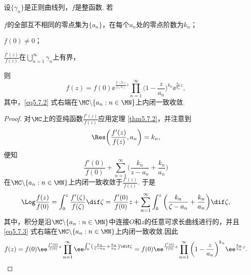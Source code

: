 \begin{theorem}\label{thm5.7.3}
设$\{\gamma_n\}$是正则曲线列，$f$是整函数. 若
\begin{eenum}
  \item $f$的全部互不相同的零点集为$\{a_n\}$，在每个$a_n$处的零点阶数为$k_n$；
  \item $f(0)\ne0$；
  \item $\frac{f'(z)}{f(z)}$在$\bigcup_{n=1}^\infty\gamma_n$上有界，
\end{eenum}
则
\begin{equation}\label{eq5.7.2}
f(z)=f(0)\ee^{\frac{f'(0)}{f(0)}z}\prod_{n=1}^\infty\bigg(1-\frac z{a_n}\bigg)
^{k_n}\ee^{\frac{k_n}{a_n}z},
\end{equation}
其中，\eqref{eq5.7.2} 式右端在$\MC\backslash\{a_n:n\in\MN\}$上内闭一致收敛.
\end{theorem}
\begin{proof}
对$\MC$上的亚纯函数$\frac{f'(z)}{f(z)}$应用定理 \ref{thm5.7.2}，并注意到
\[\Res\bigg(\frac{f'(z)}{f(z)},a_n\bigg)=k_n,\]
便知
\[\frac{f'(0)}{f(0)}+\sum_{n=1}^\infty\bigg(\frac{k_n}{z-a_n}+\frac{k_n}{a_n}\bigg)\]
在$\MC\backslash\{a_n:n\in\MN\}$上内闭一致收敛于$\frac{f'(z)}{f(z)}$. 于是
\begin{equation}\label{eq5.7.3}
\Log\frac{f(z)}{f(0)}=\int_0^z\frac{f'(\zeta)}{f(\zeta)}\dif \zeta=\frac{f'(0)}{f(0)}z+\sum_{n=1}^\infty\int_0^z\bigg(\frac{k_n}{\zeta-a_n}+
\frac{k_n}{a_n}\bigg)\dif \zeta,
\end{equation}
其中，积分是沿$\MC\backslash\{a_n:n\in\MN\}$中连接$O$和$z$的任意可求长曲线进行的，并且 \eqref{eq5.7.3} 式右端在$\MC\backslash\{a_n:n\in\MN\}$上内闭一致收敛.因此
\begin{equation*}
  f(z) = f(0)\ee^{\frac{f'(0)}{f(0)}z}\prod_{n=1}^\infty \ee^{\int_0^z\left(\frac{k_n}{\zeta-a_n}+
  \frac{k_n}{a_n}\right) \dif \zeta}
  = f(0)\ee^{\frac{f'(0)}{f(0)}z}\prod_{n=1}^\infty\bigg(1-\frac z{a_n}\bigg)  ^{k_n}\ee^{\frac{k_n}{a_n}z}. \qedhere
\end{equation*}
\end{proof}

